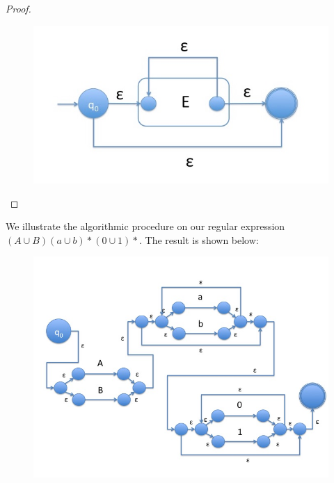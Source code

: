 \documentclass[a4paper, 12pt]{article}
\begin{document}
\begin{proof}
\begin{figure}[!htb]
\centering
\includegraphics[max width=\textwidth]{:lfa:kleene.jpg}
\end{figure}



\end{proof}

We illustrate the algorithmic procedure on our regular expression $(A\cup B)(a\cup b)*(0 \cup 1)*$.
The result is shown below:


\begin{figure}[!htb]
\centering
\includegraphics[max width=\textwidth]{:lfa:slide4.jpg}
\end{figure}
\end{document}
